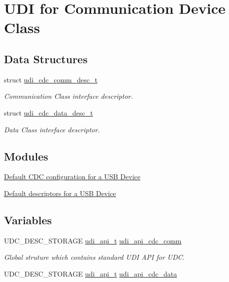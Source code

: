 \hypertarget{group__udi__cdc__group}{
\section{\-U\-D\-I for \-Communication \-Device \-Class}
\label{group__udi__cdc__group}
}
\subsection*{\-Data \-Structures}
\begin{DoxyCompactItemize}
\item 
struct \hyperlink{structudi__cdc__comm__desc__t}{udi\-\_\-cdc\-\_\-comm\-\_\-desc\-\_\-t}
\begin{DoxyCompactList}\small\item\em \-Communication \-Class interface descriptor. \end{DoxyCompactList}\item 
struct \hyperlink{structudi__cdc__data__desc__t}{udi\-\_\-cdc\-\_\-data\-\_\-desc\-\_\-t}
\begin{DoxyCompactList}\small\item\em \-Data \-Class interface descriptor. \end{DoxyCompactList}\end{DoxyCompactItemize}
\subsection*{\-Modules}
\begin{DoxyCompactItemize}
\item 
\hyperlink{group__udi__cdc__group__conf}{\-Default C\-D\-C configuration for a U\-S\-B Device}
\item 
\hyperlink{group__udi__cdc__group__desc}{\-Default descriptors for a U\-S\-B Device}
\end{DoxyCompactItemize}
\subsection*{\-Variables}
\begin{DoxyCompactItemize}
\item 
\-U\-D\-C\-\_\-\-D\-E\-S\-C\-\_\-\-S\-T\-O\-R\-A\-G\-E \hyperlink{structudi__api__t}{udi\-\_\-api\-\_\-t} \hyperlink{group__udi__cdc__group_gad7b0a90350a1f1a7c62fab1a749bf687}{udi\-\_\-api\-\_\-cdc\-\_\-comm}
\begin{DoxyCompactList}\small\item\em \-Global struture which contains standard \-U\-D\-I \-A\-P\-I for \-U\-D\-C. \end{DoxyCompactList}\item 
\-U\-D\-C\-\_\-\-D\-E\-S\-C\-\_\-\-S\-T\-O\-R\-A\-G\-E \hyperlink{structudi__api__t}{udi\-\_\-api\-\_\-t} \hyperlink{group__udi__cdc__group_ga3f85c229cc3218b75cb4844b8e9ad2d7}{udi\-\_\-api\-\_\-cdc\-\_\-data}
\end{DoxyCompactItemize}
